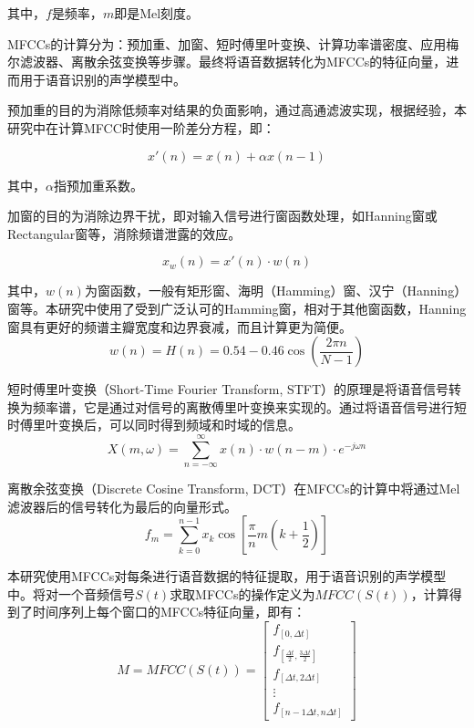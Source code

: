 \documentclass[lang=cn,cite=super]{elegantpaper}
\begin{document}
其中，$f$是频率，$m$即是Mel刻度。

MFCCs的计算分为：预加重、加窗、短时傅里叶变换、计算功率谱密度、应用梅尔滤波器、离散余弦变换等步骤。最终将语音数据转化为MFCCs的特征向量，进而用于语音识别的声学模型中。

预加重的目的为消除低频率对结果的负面影响，通过高通滤波实现，根据经验，本研究中在计算MFCC时使用一阶差分方程，即：

\begin{equation}
    x'(n) = x(n) + \alpha x(n-1) 
\end{equation}

其中，$\alpha$指预加重系数。

加窗的目的为消除边界干扰，即对输入信号进行窗函数处理，如Hanning窗或Rectangular窗等，消除频谱泄露的效应。

\begin{equation}
    x_w(n) = x'(n) \cdot w(n)
\end{equation}

其中，$w(n)$为窗函数，一般有矩形窗、海明（Hamming）窗、汉宁（Hanning）窗等。本研究中使用了受到广泛认可的Hamming窗，相对于其他窗函数，Hanning窗具有更好的频谱主瓣宽度和边界衰减，而且计算更为简便。
\begin{equation}
    w(n) = H(n) = 0.54 - 0.46 \cos \left( \frac{2\pi n}{N-1} \right)
\end{equation}

短时傅里叶变换（Short-Time Fourier Transform, STFT）的原理是将语音信号转换为频率谱，它是通过对信号的离散傅里叶变换来实现的。通过将语音信号进行短时傅里叶变换后，可以同时得到频域和时域的信息。
\begin{equation}
    X(m, \omega) = \sum_{n=-\infty}^{\infty} x(n) \cdot w(n-m) \cdot e^{-j\omega n}
\end{equation}

离散余弦变换（Discrete Cosine Transform, DCT）在MFCCs的计算中将通过Mel滤波器后的信号转化为最后的向量形式。
\begin{equation}
    f_m = \sum_{k=0}^{n-1} x_k \cos [\frac{\pi}{n}m(k+\frac{1}{2})]
\end{equation}

本研究使用MFCCs对每条进行语音数据的特征提取，用于语音识别的声学模型中。将对一个音频信号$S(t)$求取MFCCs的操作定义为${MFCC}(S(t))$，计算得到了时间序列上每个窗口的MFCCs特征向量，即有：
\begin{equation}
    M = MFCC(S(t)) = 
    \begin{bmatrix}
        f_{[0,\Delta t]}\\
        f_{[\frac{\Delta t}{2},\frac{3\Delta t}{2}]}\\
        f_{[\Delta t,2\Delta t]}\\
        \vdots\\
        f_{[n-1\Delta t,n\Delta t]}
    \end{bmatrix}
\end{equation}
\end{document}
